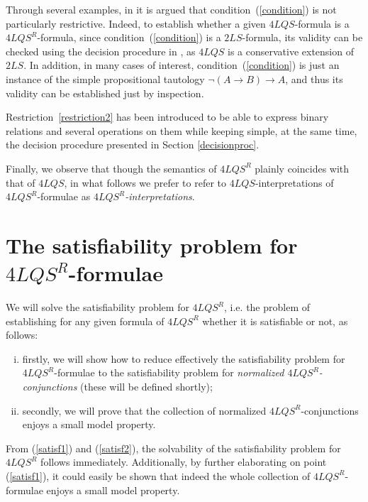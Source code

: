 \documentclass{fundam}
\newcommand{\QLQSR}{\ensuremath{\mbox{$4\mathit{LQS}^{R}$}}\xspace}
\newcommand{\QLQS}{\ensuremath{\mbox{$4\mathit{LQS}$}}\xspace}
\begin{document}
Through several examples, in \cite{CanNic08} it is argued that
condition~(\ref{condition}) is not particularly restrictive.  Indeed,
to establish whether a given $\QLQS$-formula is a $\QLQSR$-formula,
since condition~(\ref{condition}) is a $2LS$-formula, its validity can
be checked using the decision procedure in \cite{FerOm1978}, as
$\QLQS$ is a conservative extension of $2LS$.  In addition, in many
cases of interest, condition~(\ref{condition}) is just an instance of
the simple propositional tautology $\neg( A \rightarrow B) \rightarrow
A$, and thus its validity can be established just by inspection.

Restriction~\ref{restriction2} has been introduced to be able to
express binary relations and several operations on them while keeping simple, at the same time, the decision procedure presented in Section \ref{decisionproc}.

Finally, we observe that though the semantics of $\QLQSR$ plainly
coincides with that of $\QLQS$, in what follows we prefer to
refer to $\QLQS$-interpretations of $\QLQSR$-formulae as
\emph{$\QLQSR$-interpretations}.


\section{The satisfiability problem for
$\QLQSR$-formulae}\label{satisfiability}

We will solve the satisfiability problem for $\QLQSR$, i.e. the
problem of establishing for any given formula of $\QLQSR$ whether it
is satisfiable or not, as follows:
\begin{enumerate}[(i)]
    \item \label{satisf1} firstly, we will show how to reduce
    effectively the satisfiability problem for $\QLQSR$-formulae to
    the satisfiability problem for \emph{normalized
    $\QLQSR$-conjunctions} (these will be defined shortly);

    \item \label{satisf2} secondly, we will prove that the collection
    of normalized $\QLQSR$-conjunctions enjoys a small model property.
\end{enumerate}
From (\ref{satisf1}) and (\ref{satisf2}), the solvability of the satisfiability problem for
$\QLQSR$ follows immediately.  Additionally, by further elaborating on
point (\ref{satisf1}), it could easily be shown that indeed the whole collection
of $\QLQSR$-formulae enjoys a small model property.
\end{document}
